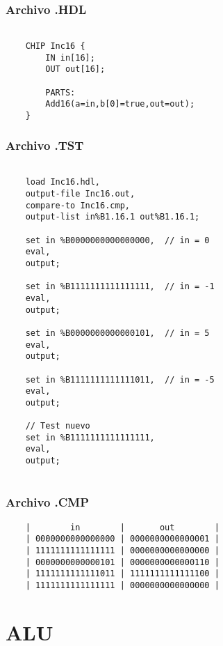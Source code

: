 \documentclass[12pt]{article}
\begin{document}
\subsubsection{Archivo .HDL}
\begin{lstlisting}

	CHIP Inc16 {
		IN in[16];
		OUT out[16];

		PARTS:
		Add16(a=in,b[0]=true,out=out);
	}
\end{lstlisting}
\subsubsection{Archivo .TST}
\begin{lstlisting}

	load Inc16.hdl,
	output-file Inc16.out,
	compare-to Inc16.cmp,
	output-list in%B1.16.1 out%B1.16.1;

	set in %B0000000000000000,  // in = 0
	eval,
	output;

	set in %B1111111111111111,  // in = -1
	eval,
	output;

	set in %B0000000000000101,  // in = 5
	eval,
	output;

	set in %B1111111111111011,  // in = -5
	eval,
	output;

	// Test nuevo
	set in %B1111111111111111,
	eval,
	output;


\end{lstlisting}

\subsubsection{Archivo .CMP}
\begin{lstlisting}
	|        in        |       out        |
	| 0000000000000000 | 0000000000000001 |
	| 1111111111111111 | 0000000000000000 |
	| 0000000000000101 | 0000000000000110 |
	| 1111111111111011 | 1111111111111100 |
	| 1111111111111111 | 0000000000000000 |
\end{lstlisting}
\newpage
\section{ALU}
\end{document}
